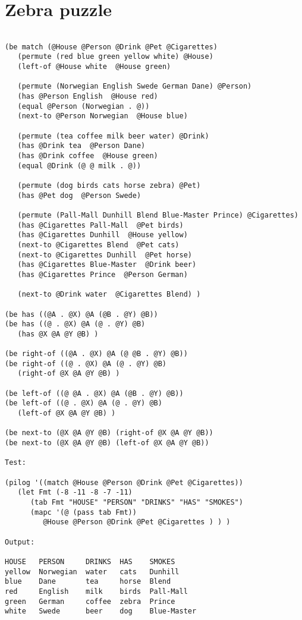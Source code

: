 \section*{Zebra puzzle}

\begin{verbatim}

(be match (@House @Person @Drink @Pet @Cigarettes)
   (permute (red blue green yellow white) @House)
   (left-of @House white  @House green)

   (permute (Norwegian English Swede German Dane) @Person)
   (has @Person English  @House red)
   (equal @Person (Norwegian . @))
   (next-to @Person Norwegian  @House blue)

   (permute (tea coffee milk beer water) @Drink)
   (has @Drink tea  @Person Dane)
   (has @Drink coffee  @House green)
   (equal @Drink (@ @ milk . @))

   (permute (dog birds cats horse zebra) @Pet)
   (has @Pet dog  @Person Swede)

   (permute (Pall-Mall Dunhill Blend Blue-Master Prince) @Cigarettes)
   (has @Cigarettes Pall-Mall  @Pet birds)
   (has @Cigarettes Dunhill  @House yellow)
   (next-to @Cigarettes Blend  @Pet cats)
   (next-to @Cigarettes Dunhill  @Pet horse)
   (has @Cigarettes Blue-Master  @Drink beer)
   (has @Cigarettes Prince  @Person German)

   (next-to @Drink water  @Cigarettes Blend) )

(be has ((@A . @X) @A (@B . @Y) @B))
(be has ((@ . @X) @A (@ . @Y) @B)
   (has @X @A @Y @B) )

(be right-of ((@A . @X) @A (@ @B . @Y) @B))
(be right-of ((@ . @X) @A (@ . @Y) @B)
   (right-of @X @A @Y @B) )

(be left-of ((@ @A . @X) @A (@B . @Y) @B))
(be left-of ((@ . @X) @A (@ . @Y) @B)
   (left-of @X @A @Y @B) )

(be next-to (@X @A @Y @B) (right-of @X @A @Y @B))
(be next-to (@X @A @Y @B) (left-of @X @A @Y @B))

Test:

(pilog '((match @House @Person @Drink @Pet @Cigarettes))
   (let Fmt (-8 -11 -8 -7 -11)
      (tab Fmt "HOUSE" "PERSON" "DRINKS" "HAS" "SMOKES")
      (mapc '(@ (pass tab Fmt))
         @House @Person @Drink @Pet @Cigarettes ) ) )

Output:

HOUSE   PERSON     DRINKS  HAS    SMOKES
yellow  Norwegian  water   cats   Dunhill
blue    Dane       tea     horse  Blend
red     English    milk    birds  Pall-Mall
green   German     coffee  zebra  Prince
white   Swede      beer    dog    Blue-Master

\end{verbatim}

